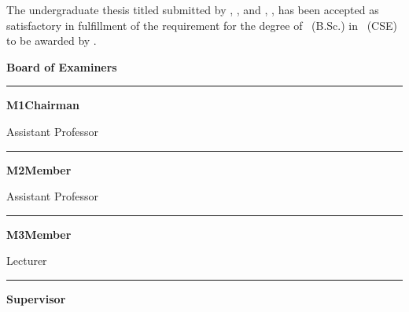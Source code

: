 \clearpage
\thispagestyle{plain}
\vspace*{0.3cm}
\noindent The undergraduate thesis titled \textit{\thesistitle} submitted by
\thesisauthor, \studentid, and \thesisauthortwo, \studentidtwo, has been
accepted as satisfactory in fulfillment of the requirement for the degree of
\thesisdegree\ (B.Sc.) in \thesisprogramme\ (CSE) to be awarded by
\thesisuniversity.

\vspace{0.8cm}
\begin{center}{\Large\bfseries Board of Examiners}\end{center}
\vspace{0.4cm}

\newcommand{\examiner}[3]{%
  \noindent\rule{6cm}{0.4pt}\par
  \noindent\textbf{#1}\hfill\textbf{#3}\par
  \noindent #2\par
  \noindent \thesisschool\par
  \noindent \thesisuniversity\par
  \vspace{0.8cm}}

\examiner{M1}{Assistant Professor}{Chairman}
\examiner{M2}{Assistant Professor}{Member}
\examiner{M3}{Lecturer}{Member}
\examiner{\thesissupervisor}{\supervisordesignation}{Supervisor}
